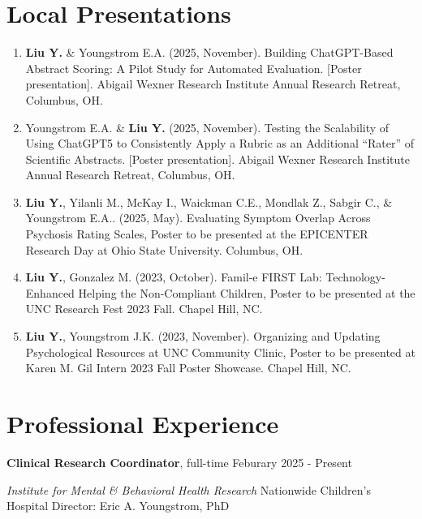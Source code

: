 \documentclass[12pt]{article}
\begin{document}
\section{Local Presentations}
\begin{enumerate}
    \item \textbf{Liu Y.} \& Youngstrom E.A. (2025, November). Building ChatGPT-Based Abstract Scoring: A Pilot Study for Automated Evaluation. [Poster presentation]. Abigail Wexner Research Institute Annual Research Retreat, Columbus, OH.

    \item Youngstrom E.A. \& \textbf{Liu Y.} (2025, November). Testing the Scalability of Using ChatGPT5 to Consistently Apply a Rubric as an Additional “Rater” of Scientific Abstracts. [Poster presentation]. Abigail Wexner Research Institute Annual Research Retreat, Columbus, OH.

    \item \textbf{Liu Y.}, Yilanli M., McKay I., Waickman C.E., Mondlak Z., Sabgir C., \& Youngstrom E.A.. (2025, May). Evaluating Symptom Overlap Across Psychosis Rating Scales, Poster to be presented at the EPICENTER Research Day at Ohio State University. Columbus, OH.

    \item \textbf{Liu Y.}, Gonzalez M. (2023, October). Famil-e FIRST Lab: Technology-Enhanced Helping the Non-Compliant Children, Poster to be presented at the UNC Research Fest 2023 Fall. Chapel Hill, NC.

    \item \textbf{Liu Y.}, Youngstrom J.K. (2023, November). Organizing and Updating Psychological Resources at UNC Community Clinic, Poster to be presented at Karen M. Gil Intern 2023 Fall Poster Showcase. Chapel Hill, NC.
\end{enumerate}

\section{Professional Experience}
\textbf{Clinical Research Coordinator}, full-time
\hfill Feburary 2025 - Present

\noindent\textit{Institute for Mental \& Behavioral Health Research}
\newline Nationwide Children's Hospital
\newline Director: Eric A. Youngstrom, PhD
\end{document}
